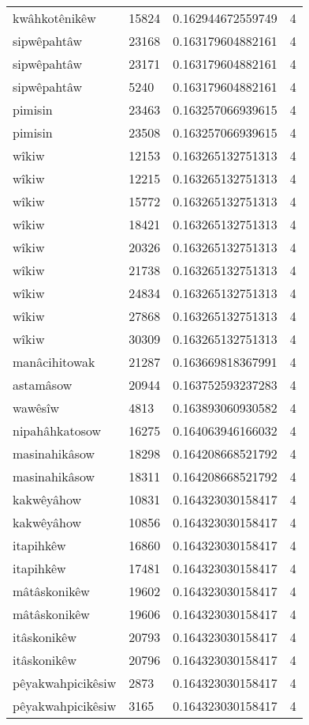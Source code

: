 \begin{longtable}{llll}
kwâhkotênikêw & 15824 & 0.162944672559749 & 4 \\
sipwêpahtâw & 23168 & 0.163179604882161 & 4 \\
sipwêpahtâw & 23171 & 0.163179604882161 & 4 \\
sipwêpahtâw & 5240 & 0.163179604882161 & 4 \\
pimisin & 23463 & 0.163257066939615 & 4 \\
pimisin & 23508 & 0.163257066939615 & 4 \\
wîkiw & 12153 & 0.163265132751313 & 4 \\
wîkiw & 12215 & 0.163265132751313 & 4 \\
wîkiw & 15772 & 0.163265132751313 & 4 \\
wîkiw & 18421 & 0.163265132751313 & 4 \\
wîkiw & 20326 & 0.163265132751313 & 4 \\
wîkiw & 21738 & 0.163265132751313 & 4 \\
wîkiw & 24834 & 0.163265132751313 & 4 \\
wîkiw & 27868 & 0.163265132751313 & 4 \\
wîkiw & 30309 & 0.163265132751313 & 4 \\
manâcihitowak & 21287 & 0.163669818367991 & 4 \\
astamâsow & 20944 & 0.163752593237283 & 4 \\
wawêsîw & 4813 & 0.163893060930582 & 4 \\
nipahâhkatosow & 16275 & 0.164063946166032 & 4 \\
masinahikâsow & 18298 & 0.164208668521792 & 4 \\
masinahikâsow & 18311 & 0.164208668521792 & 4 \\
kakwêyâhow & 10831 & 0.164323030158417 & 4 \\
kakwêyâhow & 10856 & 0.164323030158417 & 4 \\
itapihkêw & 16860 & 0.164323030158417 & 4 \\
itapihkêw & 17481 & 0.164323030158417 & 4 \\
mâtâskonikêw & 19602 & 0.164323030158417 & 4 \\
mâtâskonikêw & 19606 & 0.164323030158417 & 4 \\
itâskonikêw & 20793 & 0.164323030158417 & 4 \\
itâskonikêw & 20796 & 0.164323030158417 & 4 \\
pêyakwahpicikêsiw & 2873 & 0.164323030158417 & 4 \\
pêyakwahpicikêsiw & 3165 & 0.164323030158417 & 4 \\

\end{longtable}

